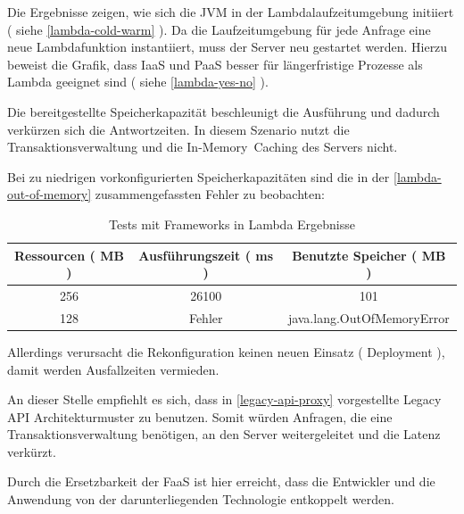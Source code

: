 \documentclass[
12pt,
english,
ngerman,
headsepline,
twoside,
openright,
numbers=noenddot,version=first
]{scrreprt}
\providecommand{\tabularnewline}{\\}
\begin{document}
Die Ergebnisse zeigen, wie sich die \acrshort{JVM} in der Lambdalaufzeitumgebung initiiert ( siehe \autoref{lambda-cold-warm} ). Da die Laufzeitumgebung für jede Anfrage eine neue Lambdafunktion instantiiert, muss der Server neu gestartet werden. Hierzu beweist die Grafik, dass \acrshort{IaaS} und \acrshort{PaaS} besser für längerfristige Prozesse als Lambda geeignet sind ( siehe \autoref{lambda-yes-no} ). 

Die bereitgestellte Speicherkapazität beschleunigt die Ausführung und dadurch verkürzen sich die Antwortzeiten. In diesem Szenario nutzt die Transaktionsverwaltung und die \glqq In-Memory\grqq\ Caching des Servers nicht.

Bei zu niedrigen vorkonfigurierten Speicherkapazitäten sind die in der \autoref{lambda-out-of-memory} zusammengefassten Fehler zu beobachten:

\begin{table}[h]
	\centering{}
	\begin{tabular}{ccc}
		\noalign{\vskip\doublerulesep}
		Ressourcen ( MB ) & Ausführungszeit ( ms ) & Benutzte Speicher ( MB ) \tabularnewline[\doublerulesep]
		\hline
		\noalign{\vskip\doublerulesep}
		256 & 26100 & 101 \tabularnewline[\doublerulesep]
		\noalign{\vskip\doublerulesep}
		\noalign{\vskip\doublerulesep}
		128 & Fehler & java.lang.OutOfMemoryError \tabularnewline[\doublerulesep]
	\end{tabular}
\caption{Tests mit Frameworks in Lambda Ergebnisse}
\label{lambda-out-of-memory}
\end{table}

Allerdings verursacht die Rekonfiguration keinen neuen Einsatz ( Deployment ), damit werden Ausfallzeiten vermieden. 

An dieser Stelle empfiehlt es sich, dass in \autoref{legacy-api-proxy} vorgestellte Legacy API Architekturmuster zu benutzen. Somit würden Anfragen, die eine Transaktionsverwaltung benötigen, an den Server weitergeleitet und die Latenz verkürzt.

Durch die Ersetzbarkeit der \acrshort{FaaS} ist hier erreicht, dass die Entwickler und die Anwendung von der darunterliegenden Technologie entkoppelt werden.%
 
\end{document}
